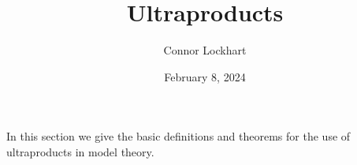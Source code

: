 \documentclass[a4paper]{article}
\title{Ultraproducts}
\date{February 8, 2024}
\author{Connor Lockhart}
\begin{document}
\maketitle
\par{In this section we give the basic definitions and theorems for the use of ultraproducts in model theory.}
\printbibliography
\end{document}
